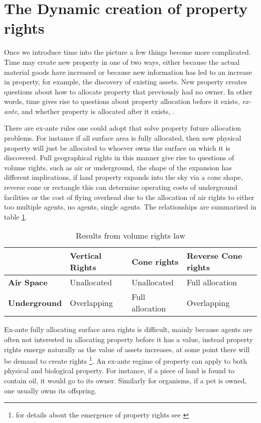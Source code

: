 \documentclass[12pt]{article}
\numberwithin{equation}{section}
\begin{document}
\newpage

\section{The Dynamic creation of property rights}

Once we introduce time into the picture a few things become more complicated. Time may create new property in one of two ways, either because the actual material goods have increased or because new information has led to an increase in property, for example, the discovery of existing assets. New property creates questions about how to allocate property that previously had no owner. In other words, time gives rise to questions about property allocation before it exists, \textit{ex-ante}, and whether property is allocated after it exists, .

There are ex-ante rules one could adopt that solve property future allocation problems. For instance if all surface area is fully allocated, then new physical property will just be allocated to whoever owns the surface on which it is discovered. Full geographical rights in this manner give rise to questions of volume rights, such as air or underground, the shape of the expansion has different implications, if land property expands into the sky via a cone shape, reverse cone or rectangle this can determine operating costs of underground facilities or the cost of flying overhead due to the allocation of air rights to either too multiple agents, no agents, single agents. The relationships are summarized in table \ref{Volume}.

\begin{table}[t]
\begin{tabular}{|l|l|l|l|}
\hline
                     & \textbf{Vertical Rights}       & \textbf{Cone rights}          & \textbf{Reverse Cone rights}  \\ \hline
\textbf{Air Space}   & Unallocated             & Unallocated            & Full allocation \\ \hline
\textbf{Underground} & Overlapping & Full allocation & Overlapping       \\ \hline
\end{tabular}
\caption{Results from volume rights law}
\label{Volume}
\end{table}

Ex-ante fully allocating surface area rights is difficult, mainly because agents are often not interested in allocating property before it has a value, instead property rights emerge naturally as the value of assets increases, at some point there will be demand to create rights \footnote{for details about the emergence of property rights see \cite{Alchian1973}}. An ex-ante regime of property can apply to both physical and biological property. For instance, if a piece of land is found to contain oil, it would go to its owner. Similarly for organisms, if a pet is owned, one usually owns its offspring.
\end{document}
